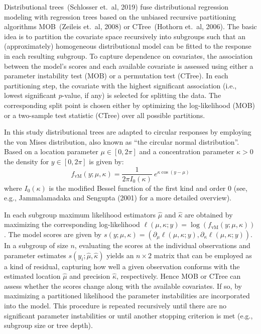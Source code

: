 \documentclass[twoside]{report}
\begin{document}
Distributional trees~(Schlosser et.~al, 2019) fuse distributional regression modeling with
regression trees based on the unbiased recursive partitioning algorithms MOB~(Zeileis et.~al, 2008)
or CTree~(Hothorn et.~al, 2006). The basic idea is to partition the covariate space recursively into 
subgroups such that an (approximately) homogeneous distributional model can be fitted to the response 
in each resulting subgroup.
To capture dependence on covariates, the association between the model's scores and each available
covariate is assessed using either a parameter instability test (MOB) or a permutation test (CTree).
In each partitioning step, the covariate with the highest significant association (i.e., lowest
significant $p$-value, if any) is selected for splitting the data. The corresponding split point
is chosen either by optimizing the log-likelihood (MOB) or a two-sample test statistic (CTree)
over all possible partitions.

In this study distributional trees are adapted to circular responses by employing the von Mises
distribution, also known as ``the circular normal distribution''. Based on a location parameter
$\mu \in [0, 2\pi]$ and a concentration parameter $\kappa > 0$ the density for $y \in [0, 2\pi]$
is given by:
\begin{equation}
  f_\mathrm{vM}(y; \mu, \kappa) = \frac{1}{2 \pi I_0(\kappa)}~e^{ \kappa \cos(y - \mu)}\label{schlosser:equ_vm}
\end{equation}
where $I_0(\kappa)$ is the modified Bessel function of the first kind and order $0$
(see, e.g., Jammalamadaka and Sengupta (2001) for a more detailed overview).

In each subgroup maximum likelihood estimators $\hat \mu$ and $\hat \kappa$ are obtained
by maximizing the corresponding log-likelihood $\ell(\mu, \kappa; y) = \log(f_\mathrm{vM}(y;\mu, \kappa))$. 
The model scores are given by  $s(y; \mu, \kappa) = (\partial_{\mu} \ell(\mu, \kappa; y),
\partial_{\kappa} \ell(\mu, \kappa; y))$. In a subgroup of size $n$, evaluating the scores
at the individual observations and parameter estimates $s(y_i; \hat{\mu}, \hat{\kappa})$
yields an $n \times 2$ matrix that can be employed as a kind of residual, capturing how well
a given observation conforms with the estimated location $\hat{\mu}$ and precision $\hat{\kappa}$, 
respectively.
Hence MOB or CTree can assess whether the scores change along with the available covariates.
If so, by maximizing a partitioned likelihood
the parameter instabilities are incorporated into the model. This procedure is repeated recursively
until there are no significant parameter instabilities or until another stopping criterion
is met (e.g., subgroup size or tree depth).
\end{document}
